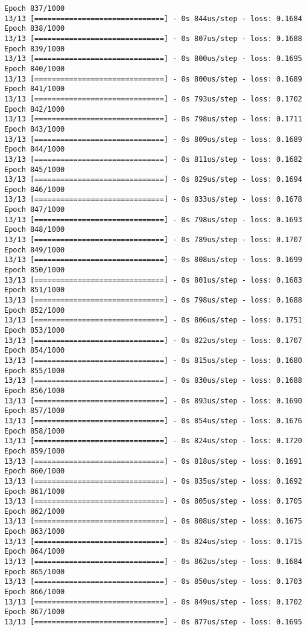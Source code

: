 \documentclass[11pt]{article}
\begin{document}
\begin{Verbatim}[commandchars=\\\{\}]
Epoch 837/1000
13/13 [==============================] - 0s 844us/step - loss: 0.1684
Epoch 838/1000
13/13 [==============================] - 0s 807us/step - loss: 0.1688
Epoch 839/1000
13/13 [==============================] - 0s 800us/step - loss: 0.1695
Epoch 840/1000
13/13 [==============================] - 0s 800us/step - loss: 0.1689
Epoch 841/1000
13/13 [==============================] - 0s 793us/step - loss: 0.1702
Epoch 842/1000
13/13 [==============================] - 0s 798us/step - loss: 0.1711
Epoch 843/1000
13/13 [==============================] - 0s 809us/step - loss: 0.1689
Epoch 844/1000
13/13 [==============================] - 0s 811us/step - loss: 0.1682
Epoch 845/1000
13/13 [==============================] - 0s 829us/step - loss: 0.1694
Epoch 846/1000
13/13 [==============================] - 0s 833us/step - loss: 0.1678
Epoch 847/1000
13/13 [==============================] - 0s 798us/step - loss: 0.1693
Epoch 848/1000
13/13 [==============================] - 0s 789us/step - loss: 0.1707
Epoch 849/1000
13/13 [==============================] - 0s 808us/step - loss: 0.1699
Epoch 850/1000
13/13 [==============================] - 0s 801us/step - loss: 0.1683
Epoch 851/1000
13/13 [==============================] - 0s 798us/step - loss: 0.1688
Epoch 852/1000
13/13 [==============================] - 0s 806us/step - loss: 0.1751
Epoch 853/1000
13/13 [==============================] - 0s 822us/step - loss: 0.1707
Epoch 854/1000
13/13 [==============================] - 0s 815us/step - loss: 0.1680
Epoch 855/1000
13/13 [==============================] - 0s 830us/step - loss: 0.1688
Epoch 856/1000
13/13 [==============================] - 0s 893us/step - loss: 0.1690
Epoch 857/1000
13/13 [==============================] - 0s 854us/step - loss: 0.1676
Epoch 858/1000
13/13 [==============================] - 0s 824us/step - loss: 0.1720
Epoch 859/1000
13/13 [==============================] - 0s 818us/step - loss: 0.1691
Epoch 860/1000
13/13 [==============================] - 0s 835us/step - loss: 0.1692
Epoch 861/1000
13/13 [==============================] - 0s 805us/step - loss: 0.1705
Epoch 862/1000
13/13 [==============================] - 0s 808us/step - loss: 0.1675
Epoch 863/1000
13/13 [==============================] - 0s 824us/step - loss: 0.1715
Epoch 864/1000
13/13 [==============================] - 0s 862us/step - loss: 0.1684
Epoch 865/1000
13/13 [==============================] - 0s 850us/step - loss: 0.1703
Epoch 866/1000
13/13 [==============================] - 0s 849us/step - loss: 0.1702
Epoch 867/1000
13/13 [==============================] - 0s 877us/step - loss: 0.1695

\end{Verbatim}
\end{document}
